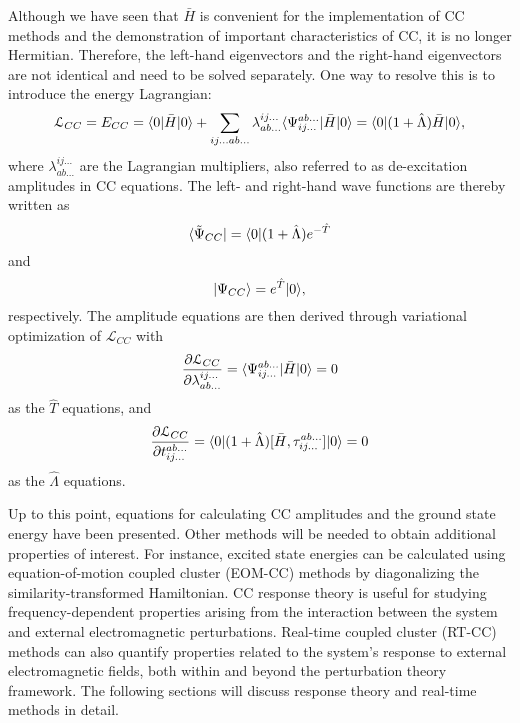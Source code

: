 Although we have seen that $\bar{H}$ is convenient for the implementation of CC methods and the demonstration of important characteristics of CC, it is no longer Hermitian. Therefore, the left-hand eigenvectors and the right-hand eigenvectors are not identical and need to be solved separately. One way to resolve this is to introduce the energy Lagrangian:\cite{Beavis1990, Koch1990} 
\begin{equation}
\mathcal{L}_{CC} = E_{CC} = \langle0 |\bar{H}| 0 \rangle + \sum_{ij...ab...}\lambda_{ab...}^{ij...}\langle\Psi_{ij...}^{ab...} |\bar{H}| 0 \rangle 
                                             = \langle0 |(1 + \hat{\Lambda})\bar{H}| 0 \rangle,
\label{eq:cc-lag}                                          
\end{equation}
where $\lambda_{ab...}^{ij...}$ are the Lagrangian multipliers, also referred to as de-excitation amplitudes in CC equations. The left- and right-hand wave functions are thereby written as
\begin{equation}
\langle\tilde{\Psi}_{CC} | = \langle0 |(1 + \hat{\Lambda})e^{-\hat{T}} 
\label{eq:cc-left-wfn}
\end{equation}
and
\begin{equation}
| \Psi_{CC} \rangle = e^{\hat{T}}| 0 \rangle,
\label{eq:cc-right-wfn}
\end{equation}
respectively. The amplitude equations are then derived through variational optimization of $\mathcal{L}_{CC}$ with
\begin{equation}
\frac{\partial \mathcal{L}_{CC}}{\partial \lambda_{ab...}^{ij...}} = \langle\Psi_{ij...}^{ab...} |\bar{H}| 0 \rangle = 0
\label{eq:cc-t-eqn}
\end{equation}
as the $\hat{T}$ equations, and 
\begin{equation}
\frac{\partial \mathcal{L}_{CC}}{\partial t_{ij...}^{ab...}} = \langle0 |(1 + \hat{\Lambda})[\bar{H}, \tau_{ij...}^{ab...}]| 0 \rangle = 0
\label{eq:cc-l-eqn}
\end{equation}
as the $\hat{\Lambda}$ equations.

Up to this point, equations for calculating CC amplitudes and the ground state energy have been presented. Other methods will be needed to obtain additional properties of interest. For instance, excited state energies can be calculated using equation-of-motion coupled cluster (EOM-CC) methods\cite{Geertsen1989, Stanton1993} by diagonalizing the similarity-transformed Hamiltonian. CC response theory\cite{Monkhorst1977, Dalgaard1983} is useful for studying frequency-dependent properties arising from the interaction between the system and external electromagnetic perturbations. Real-time coupled cluster (RT-CC) methods\cite{Schonhammer1978, Hoodbhoy1979} can also quantify properties related to the system's response to external electromagnetic fields, both within and beyond the perturbation theory framework. The following sections will discuss response theory and real-time methods in detail. 

